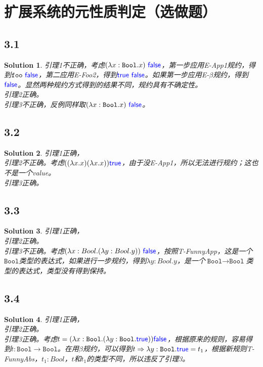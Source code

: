\documentclass[11pt, a4paper]{article}
\newtheorem{Solution}{Solution}
\let\t\texttt
\newcommand{\Bool}{\t{Bool}}
\newcommand{\kword}[1]{{\color{blue} \textsf{#1}}}
\newcommand{\True}{\kword{true}}
\newcommand{\False}{\kword{false}}
\begin{document}
\section{扩展系统的元性质判定（选做题）}
    \subsection*{3.1}
    \begin{Solution}
        引理1不正确，考虑$(\lambda x:\Bool.x)~\False$，第一步应用E-App1规约，得到$\t{foo}~\False$，第二应用E-Foo2，得到$\True~\False$。如果第一步应用E-$\beta$规约，得到$\False$。显然两种规约方式得到的结果不同，规约具有不确定性。\\
        引理2正确。\\
        引理3不正确，反例同样取$(\lambda x:\Bool.x)~\False$。
    \end{Solution}
    \subsection*{3.2}
    \begin{Solution}
        引理1正确，\\
        引理2不正确。考虑$((\lambda x.x)(\lambda x.x))\True$，由于没E-App1，所以无法进行规约；这也不是一个value。\\
        引理3正确。
    \end{Solution}
    \subsection*{3.3}
    \begin{Solution}
        引理1正确，\\
        引理2正确。\\
        引理3不正确。考虑$(\lambda x:Bool.(\lambda y:Bool.y))~\False$，按照T-FunnyApp，这是一个$\Bool$类型的表达式，如果进行一步规约，得到$\lambda y:Bool.y$，是一个$\Bool\rightarrow \Bool$类型的表达式，类型没有得到保持。
    \end{Solution}
    \subsection*{3.4}
    \begin{Solution}
        引理1正确，\\
        引理2正确。\\
        引理3正确。考虑$t=(\lambda x:\Bool.(\lambda y:\Bool.\True))\False$，根据原来的规则，容易得到$t:\Bool \rightarrow \Bool$。在用$\beta$规约，可以得到$t\Rightarrow \lambda y:\Bool.\True = t_1$，根据新规则T-FunnyAbs，$t_1:Bool$，$t$和$t_1$的类型不同，所以违反了引理3。
    \end{Solution}
\end{document}
